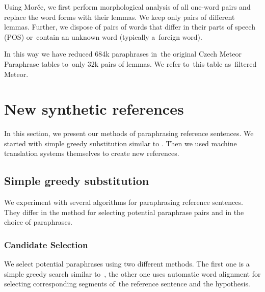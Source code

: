 \documentclass[11pt]{article}
\begin{document}
Using Morče, we first perform morphological analysis of all one-word pairs and replace 
the word forms with their lemmas.  We keep only pairs of different lemmas. Further, we
 dispose of pairs of words that differ in their parts of speech (POS) or~contain an 
unknown word (typically a~foreign word). 

In this way we have reduced 684k paraphrases in~the original Czech Meteor Paraphrase tables 
to~only 32k pairs of lemmas. We refer to~this table as~filtered Meteor.

\section{New synthetic references}
In this section, we present our methods of paraphrasing reference sentences. We started
with simple greedy substitution similar to \cite{kauchak}. Then we used machine translation
systems themselves to create new references.

\subsection{Simple greedy substitution}
\label{lrec}
We experiment with several algorithms for paraphrasing reference sentences. They differ
in the method for selecting potential paraphrase pairs and in the choice of paraphrases.

\subsubsection{Candidate Selection}
We select potential paraphrases using two different methods. The first one is a simple 
greedy search similar to~, the other one uses automatic word alignment 
for selecting corresponding segments of~the reference sentence and the hypothesis.
\end{document}
